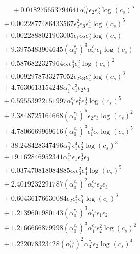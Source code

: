 \documentclass[10pt]{article}
\begin{document}
\begin{align*}
\phantom{F_{s,7}} &\phantom{={}}{}  + 0.018275653794641 \alpha_{0}^{c_s} \epsilon_{2} \epsilon_{3}^{5} \log{\left(c_{s} \right)}^{5} \\
&{}  + 0.0022877486433567 \epsilon_{2}^{2} \epsilon_{3} \epsilon_{4}^{4} \log{\left(c_{s} \right)}^{5} \\
&{}  + 0.0022888021903005 \epsilon_{1} \epsilon_{2} \epsilon_{3}^{5} \log{\left(c_{s} \right)} \\
&{}  + 9.3975483904645 \left(\alpha_{0}^{c_s}\right)^{3} \alpha_{2}^{c_s} \epsilon_{1} \log{\left(c_{s} \right)} \\
&{}  + 0.5876822327964 \epsilon_{2} \epsilon_{3}^{4} \epsilon_{4}^{2} \log{\left(c_{s} \right)}^{2} \\
&{}  + 0.0092978733277052 \epsilon_{2} \epsilon_{3} \epsilon_{4}^{5} \log{\left(c_{s} \right)}^{3} \\
&{}  + 4.7630613154248 \alpha_{1}^{c_s} \epsilon_{1}^{3} \epsilon_{2} \epsilon_{3} \\
&{}  + 0.59553922151997 \alpha_{1}^{c_s} \epsilon_{1}^{2} \epsilon_{2}^{3} \log{\left(c_{s} \right)}^{5} \\
&{}  + 2.3848725164668 \left(\alpha_{0}^{c_s}\right)^{5} \epsilon_{2} \epsilon_{3} \log{\left(c_{s} \right)}^{2} \\
&{}  + 4.7806669969616 \left(\alpha_{0}^{c_s}\right)^{3} \epsilon_{1}^{3} \epsilon_{2} \log{\left(c_{s} \right)}^{5} \\
&{}  + 38.248428347496 \alpha_{0}^{c_s} \epsilon_{1}^{4} \epsilon_{2}^{2} \log{\left(c_{s} \right)}^{3} \\
&{}  + 19.162846952341 \alpha_{1}^{c_s} \epsilon_{1} \epsilon_{2}^{3} \epsilon_{3} \\
&{}  + 0.037470818084885 \epsilon_{2} \epsilon_{3}^{2} \epsilon_{4}^{4} \log{\left(c_{s} \right)}^{5} \\
&{}  + 2.4019232291787 \left(\alpha_{0}^{c_s}\right)^{2} \alpha_{2}^{c_s} \epsilon_{2} \epsilon_{3} \\
&{}  + 0.60436176630084 \epsilon_{2} \epsilon_{3}^{4} \epsilon_{4}^{2} \log{\left(c_{s} \right)}^{3} \\
&{}  + 1.2139601980143 \left(\alpha_{0}^{c_s}\right)^{3} \alpha_{1}^{c_s} \epsilon_{1} \epsilon_{2} \\
&{}  + 1.2166666879998 \left(\alpha_{0}^{c_s}\right)^{3} \alpha_{1}^{c_s} \epsilon_{2}^{2} \log{\left(c_{s} \right)}^{2} \\
&{}  + 1.222078323428 \left(\alpha_{0}^{c_s}\right)^{2} \alpha_{3}^{c_s} \epsilon_{2} \log{\left(c_{s} \right)}^{4} \\

\end{align*}
\end{document}
